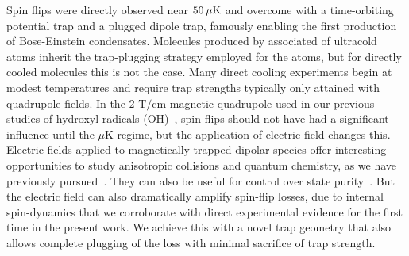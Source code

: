 \documentclass[%
 reprint,
 amsmath,amssymb,
 aps,
prl,
]{revtex4-1}
\newcommand{\s}{{\nobreak\hspace{.2em}}}
\begin{document}
Spin flips were directly observed near $50\s\mu\text{K}$ and overcome with a time-orbiting potential trap\s\cite{Petrich1995} and a plugged dipole trap\s\cite{Davis1995}, famously enabling the first production of Bose-Einstein condensates.
Molecules produced by associated of ultracold atoms inherit the trap-plugging strategy employed for the atoms, but for directly cooled molecules this is not the case.
Many direct cooling experiments begin at modest temperatures and require trap strengths typically only attained with quadrupole fields\s\cite{Weinstein1998, Riedel2011, Quintero-Perez2014, Akerman2017}.
In the $2\text{ T/cm}$ magnetic quadrupole used in our previous studies of hydroxyl radicals (OH)~\cite{Stuhl2012evap}, spin-flips should not have had a significant influence until the $\mu$K regime, but the application of electric field changes this.
Electric fields applied to magnetically trapped dipolar species offer interesting opportunities to study anisotropic collisions and quantum chemistry, as we have previously pursued~\cite{Stuhl2013}.
They can also be useful for control over state purity~\cite{Stuhl2012uwave}.
But the electric field can also dramatically amplify spin-flip losses, due to internal spin-dynamics that we corroborate with direct experimental evidence for the first time in the present work.
We achieve this with a novel trap geometry that also allows complete plugging of the loss with minimal sacrifice of trap strength.
\end{document}
